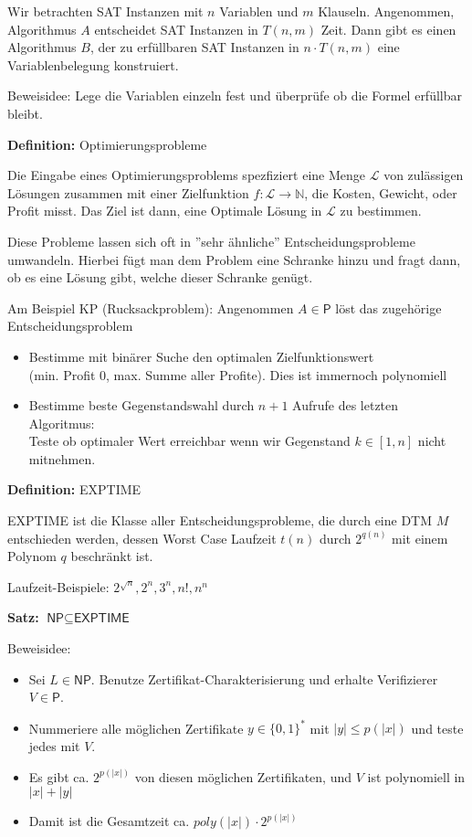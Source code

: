 \documentclass[a4paper,graphics,11pt]{article}
\begin{document}
Wir betrachten SAT Instanzen mit $n$ Variablen und $m$ Klauseln. Angenommen, Algorithmus $A$ entscheidet
SAT Instanzen in $T(n,m)$ Zeit. Dann gibt es einen Algorithmus $B$, der zu erfüllbaren SAT Instanzen
in $n\cdot T(n,m)$ eine Variablenbelegung konstruiert.

Beweisidee: Lege die Variablen einzeln fest und überprüfe ob die Formel erfüllbar bleibt.

\strut

\textbf{Definition:} Optimierungsprobleme

Die Eingabe eines Optimierungsproblems spezfiziert eine Menge $\mathcal{L}$ von zulässigen Lösungen
zusammen mit einer Zielfunktion $f : \mathcal{L} \to \mathbb{N}$, die Kosten, Gewicht, oder Profit misst.
Das Ziel ist dann, eine Optimale Lösung in $\mathcal{L}$ zu bestimmen.

Diese Probleme lassen sich oft in ''sehr ähnliche'' Entscheidungsprobleme umwandeln.
Hierbei fügt man dem Problem eine Schranke hinzu und fragt dann, ob es eine Lösung gibt,
welche dieser Schranke genügt.

Am Beispiel KP (Rucksackproblem): Angenommen $A \in \textsf{P}$ löst das zugehörige Entscheidungsproblem
\begin{itemize}
    \item Bestimme mit binärer Suche den optimalen Zielfunktionswert\\
        (min. Profit 0, max. Summe aller Profite). Dies ist immernoch polynomiell
    \item Bestimme beste Gegenstandswahl durch $n+1$ Aufrufe des letzten Algoritmus:\\
        Teste ob optimaler Wert erreichbar wenn wir Gegenstand $k \in [1,n]$ nicht mitnehmen.
\end{itemize}

\strut

\textbf{Definition:} \textsf{EXPTIME}

\textsf{EXPTIME} ist die Klasse aller Entscheidungsprobleme,
die durch eine DTM $M$ entschieden werden, dessen Worst Case Laufzeit $t(n)$
durch $2^{q(n)}$ mit einem Polynom $q$ beschränkt ist.

Laufzeit-Beispiele: $2^{\sqrt{n}}, 2^n, 3^n, n!, n^n$

\newpage

\textbf{Satz:} $\textsf{NP} \subseteq \textsf{EXPTIME}$

Beweisidee:
\begin{itemize}
    \item Sei $L \in \textsf{NP}$. Benutze Zertifikat-Charakterisierung und erhalte Verifizierer $V \in \textsf{P}$.
    \item Nummeriere alle möglichen Zertifikate $y \in \{0,1\}^*$  mit $|y| \leq p(|x|)$ und teste jedes mit $V$.
    \item Es gibt ca. $2^{p(|x|)}$ von diesen möglichen Zertifikaten,
        und $V$ ist polynomiell in $|x| + |y|$
    \item Damit ist die Gesamtzeit ca. $poly(|x|)\cdot 2^{p(|x|)}$
\end{itemize}
\end{document}

